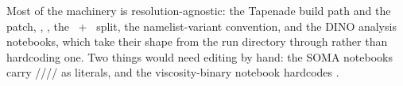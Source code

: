 Most of the machinery is resolution-agnostic: the Tapenade build path and the
 patch, , , the
~+~ split, the namelist-variant convention,
and the DINO analysis notebooks, which take their shape from the run directory
through  rather than hardcoding
one. Two things would need editing by hand: the SOMA notebooks carry
//// as literals, and the
viscosity-binary notebook hardcodes .
